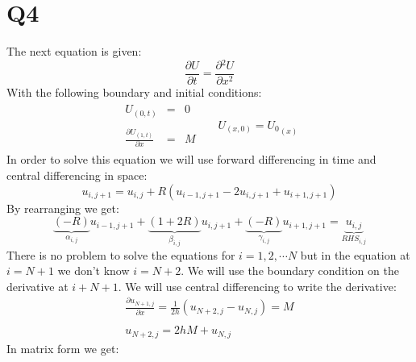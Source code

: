 \documentclass[11pt, a4paper]{article}
\newcommand{\parder}[2]{\frac{\partial {#1}}{\partial {#2}}}
\begin{document}
\section{Q4}
The next equation is given:
\begin{equation}
    \parder{U}{t}=\parder{^2U}{x^2}
\end{equation}
With the following boundary and initial conditions:
\begin{equation}
    \begin{matrix}
        \begin{array}{rcl}
            \displaystyle U_{\left(0,t\right)} & = & 0 \\\\
            \displaystyle \parder{U_{\left(1,t\right)}}{x} & = & M
        \end{array} && U_{\left(x,0\right)}={U_0}_{\left(x\right)}
    \end{matrix}
\end{equation}
In order to solve this equation we will use forward differencing in time and central differencing in space:
\begin{equation}
    u_{i,j+1}=u_{i,j}+R\left(u_{i-1,j+1}-2u_{i,j+1}+u_{i+1,j+1}\right)
\end{equation}
By rearranging we get:
\begin{equation}
    \underbrace{\left(-R\right)}_{\alpha_{i,j}} u_{i-1,j+1}+\underbrace{\left(1+2R\right)}_{\beta_{i,j}} u_{i,j+1}+\underbrace{\left(-R\right)}_{\gamma_{i,j}} u_{i+1,j+1}=\underbrace{u_{i,j}}_{RHS_{i,j}}
\end{equation}
There is no problem to solve the equations for $i=1,2,\cdots N$ but in the equation at $i=N+1$ we don't know $i=N+2$. We will use the boundary condition on the derivative at $i+N+1$. We will use central differencing to write the derivative:
\begin{equation}
    \begin{array}{c}
        \displaystyle \parder{u_{N+1,j}}{x}=\frac{1}{2h}\left(u_{N+2,j}-u_{N,j}\right)=M \\\\
        \displaystyle u_{N+2,j}=2hM+u_{N,j}
    \end{array}
\end{equation}
In matrix form we get:
\end{document}
